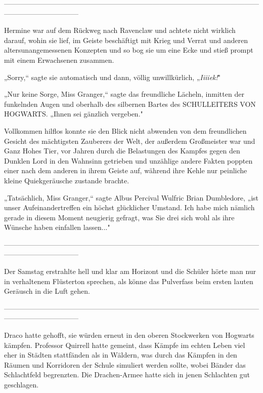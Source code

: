 {--------------------------------------------------------------------------------------------------------------------------------------------

\hfill\break Hermine war auf dem Rückweg nach Ravenclaw und achtete nicht wirklich darauf, wohin sie lief, im Geiste beschäftigt mit Krieg und Verrat und anderen altersunangemessenen Konzepten und so bog sie um eine Ecke und stieß prompt mit einem Erwachsenen zusammen.

„Sorry,“ sagte sie automatisch und dann, völlig unwillkürlich, „\emph{Iiiiek!}"

„Nur keine Sorge, Miss Granger,“ sagte das freundliche Lächeln, inmitten der funkelnden Augen und oberhalb des silbernen Bartes des SCHULLEITERS VON HOGWARTS. „Ihnen sei gänzlich vergeben."

Vollkommen hilflos konnte sie den Blick nicht abwenden von dem freundlichen Gesicht des mächtigsten Zauberers der Welt, der außerdem Großmeister war und Ganz Hohes Tier, vor Jahren durch die Belastungen des Kampfes gegen den Dunklen Lord in den Wahnsinn getrieben und unzählige andere Fakten poppten einer nach dem anderen in ihrem Geiste auf, während ihre Kehle nur peinliche kleine Quiekgeräusche zustande brachte.

„Tatsächlich, Miss Granger,“ sagte Albus Percival Wulfric Brian Dumbledore, „ist unser Aufeinandertreffen ein höchst glücklicher Umstand. Ich habe mich nämlich gerade in diesem Moment neugierig gefragt, was Sie drei sich wohl als ihre Wünsche haben einfallen lassen..."

--------------------------------------------------------------------------------------------------------------------------------------------

\hfill\break Der Samstag erstrahlte hell und klar am Horizont und die Schüler hörte man nur in verhaltenem Flüsterton sprechen, als könne das Pulverfass beim ersten lauten Geräusch in die Luft gehen.

--------------------------------------------------------------------------------------------------------------------------------------------

\hfill\break Draco hatte gehofft, sie würden erneut in den oberen Stockwerken von Hogwarts kämpfen. Professor Quirrell hatte gemeint, dass Kämpfe im echten Leben viel eher in Städten stattfänden als in Wäldern, was durch das Kämpfen in den Räumen und Korridoren der Schule simuliert werden sollte, wobei Bänder das Schlachtfeld begrenzten. Die Drachen-Armee hatte sich in jenen Schlachten gut geschlagen.

}
